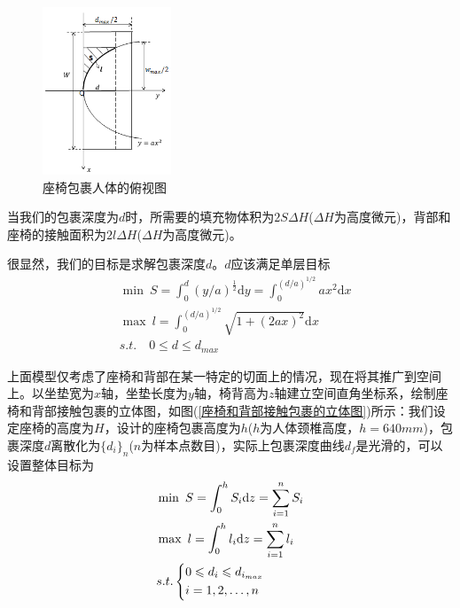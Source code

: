             \begin{figure}[H]
            \centering
            \includegraphics[height = 5cm]{images/seat_covers_the_top_view_human_body.jpg}
            \caption{座椅包裹人体的俯视图}
            \label{座椅包裹人体的俯视图}
            \end{figure}
            \par
            当我们的包裹深度为$d$时，所需要的填充物体积为$2S\Delta H$($\Delta H$为高度微元)，背部和座椅的接触面积为$2l\Delta H$($\Delta H$为高度微元)。
            \par
            很显然，我们的目标是求解包裹深度$d$。$d$应该满足单层目标
            \begin{align*}
            & \min\ S=\int_{0}^d (y/a)^{\frac{1}{2}}\mathrm{d}y = \int_{0}^{(d/a)^{1/2}} ax^2 \mathrm{d}x\\
            & \max\ l=\int_{0}^{(d/a)^{1/2}}\sqrt{1+(2ax)^2}\mathrm{d}x\\
            & s.t.\quad 0 \leqslant d \leqslant d_{max}
            \end{align*}
            \par
            上面模型仅考虑了座椅和背部在某一特定的切面上的情况，现在将其推广到空间上。以坐垫宽为$x$轴，坐垫长度为$y$轴，椅背高为$z$轴建立空间直角坐标系，绘制座椅和背部接触包裹的立体图，如图(\ref{座椅和背部接触包裹的立体图})所示：我们设定座椅的高度为$H$，设计的座椅包裹高度为$h$($h$为人体颈椎高度，$h=640mm$)，包裹深度$d$离散化为$\{d_i \}_n$($n$为样本点数目)，实际上包裹深度曲线$d_f$是光滑的，可以设置整体目标为
            \begin{align}
            \label{飞机超薄座椅模型1}
            & \min \ S=\int_0^h S_i\mathrm{d}z = \sum_{i=1}^n S_i\\
            & \max \ l=\int_0^h l_i\mathrm{d}z = \sum_{i=1}^n l_i\\
            & s.t.\left\{
            \begin{aligned}
            & 0 \leqslant d_i \leqslant d_{i_{max}}\\
            & i=1,2,\dots,n
            \end{aligned}
            \right.\notag
            \end{align}
